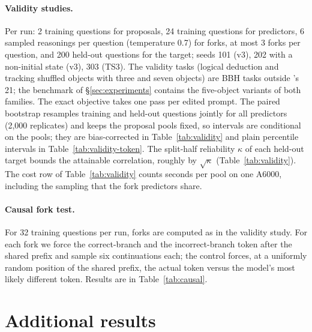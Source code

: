 \paragraph{Validity studies.} Per run: 2 training questions for proposals, 24 training
questions for predictors, 6 sampled reasonings per question (temperature 0.7) for forks, at most 3
forks per question, and 200 held-out questions for the target; seeds 101 (v3), 202 with a
non-initial state (v3), 303 (TS3). The validity tasks (logical deduction and tracking shuffled
objects with three and seven objects) are BBH tasks outside \greater{}'s 21; the benchmark of
\S\ref{sec:experiments} contains the five-object variants of both families. The exact objective takes one
pass per edited prompt. The paired bootstrap resamples training and
held-out questions jointly for all predictors (2{,}000 replicates) and keeps the proposal
pools fixed, so intervals are conditional on the pools; they are bias-corrected in
Table~\ref{tab:validity} and plain percentile intervals in Table~\ref{tab:validity-token}. The split-half
reliability $\kappa$ of each held-out target bounds the attainable correlation, roughly by
$\sqrt\kappa$ (Table~\ref{tab:validity}). The cost row of Table~\ref{tab:validity} counts seconds
per pool on one A6000, including the sampling that the fork predictors share.

\paragraph{Causal fork test.} For 32 training questions per run, forks are computed as in the
validity study. For each fork we force the correct-branch and the incorrect-branch token
after the shared prefix and sample six continuations each; the control forces, at a
uniformly random position of the shared prefix, the actual token versus the model's most
likely different token. Results are in Table~\ref{tab:causal}.

\section{Additional results}
\label{app:results}

\begin{table}[h]
\centering
\caption{\textbf{Token-level validity control:} single-token substitutions drawn from the
model's top-10 next tokens ($^t$), same training and held-out questions as the block runs
LD7/TS7 with seed 101. Columns as in Table~\ref{tab:validity}, except that the intervals are plain
percentile bootstrap intervals. The same edits are re-read under the deterministic engine in
Table~\ref{tab:reroll}.}
\label{tab:validity-token}
\resizebox{0.92\textwidth}{!}{}
\end{table}

